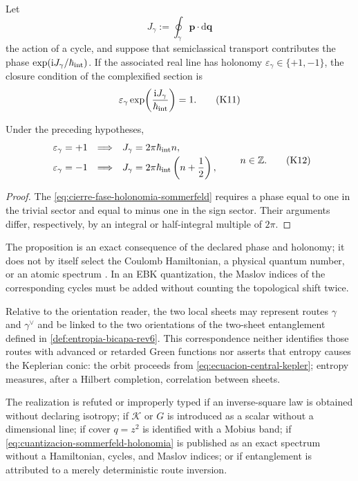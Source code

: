Let
\[
 J_\gamma:=\oint_\gamma\mathbf p\cdot\mathrm d\mathbf q
\]
the action of a cycle, and suppose that semiclassical transport contributes the
phase \(\exp(\mathrm iJ_\gamma/\hbar_{\rm int})\). If the associated real line
has holonomy \(\varepsilon_\gamma\in\{+1,-1\}\), the closure condition of
the complexified section is
\[
 \varepsilon_\gamma
 \exp\!\left(\frac{\mathrm iJ_\gamma}{\hbar_{\rm int}}\right)=1.
 \tag{K11}\label{eq:cierre-fase-holonomia-sommerfeld}
\]

\begin{proposition}
\label{prop:desplazamiento-sommerfeld-holonomia}
Under the preceding hypotheses,
\[
 \begin{array}{lll}
 \varepsilon_\gamma=+1
 &\Longrightarrow&
 J_\gamma=2\pi\hbar_{\rm int}n,\\[1mm]
 \varepsilon_\gamma=-1
 &\Longrightarrow&
 J_\gamma=2\pi\hbar_{\rm int}\left(n+\dfrac12\right),
 \end{array}
 \qquad n\in\mathbb Z.
 \tag{K12}\label{eq:cuantizacion-sommerfeld-holonomia}
\]
\end{proposition}

\begin{proof}
The \cref{eq:cierre-fase-holonomia-sommerfeld} requires a phase equal to one in the trivial sector and
equal to minus one in the sign sector. Their arguments differ,
respectively, by an integral or half-integral multiple of
\(2\pi\).
\end{proof}

The proposition is an exact consequence of the declared phase and
holonomy; it does not by itself select the Coulomb Hamiltonian, a physical
quantum number, or an atomic spectrum \cite{Sommerfeld1916}. In an
EBK quantization, the Maslov indices of the corresponding cycles must be
added without counting the topological shift twice.

Relative to the orientation reader, the two local sheets may
represent routes \(\gamma\) and \(\gamma^\vee\) and be linked to the
two orientations of the two-sheet entanglement defined in
\cref{def:entropia-bicapa-rev6}. This correspondence neither identifies
those routes with advanced or retarded Green functions nor asserts that
entropy causes the Keplerian conic: the orbit proceeds from
\eqref{eq:ecuacion-central-kepler}; entropy measures, after a
Hilbert completion, correlation between sheets.

\begin{criterion}
\label{crit:limite-kepler-sommerfeld}
The realization is refuted or improperly typed if an inverse-square law is obtained
without declaring isotropy; if
\(\mathcal K\) or \(G\) is introduced as a scalar without a dimensional line;
if cover \(q=z^2\) is identified with a Mobius band; if
\eqref{eq:cuantizacion-sommerfeld-holonomia} is published as an exact spectrum
without a Hamiltonian, cycles, and Maslov indices; or if
entanglement is attributed to a merely deterministic route inversion.
\end{criterion}

